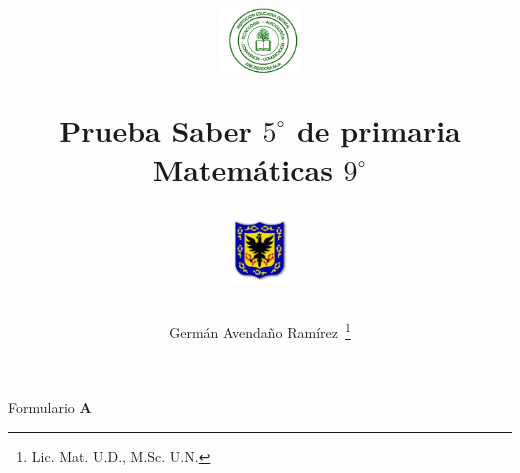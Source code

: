\documentclass[10pt,addpoints]{exam}
\begin{document}
\title{\begin{minipage}{.2\textwidth}
        \includegraphics[height=1.75cm]{Images/logo-colegio.png}
       \end{minipage}
\begin{minipage}{.55\textwidth}
 \begin{center}
Prueba Saber $5^{\circ}$ de primaria\\Matemáticas $9^{\circ}$
\end{center}
\end{minipage}
\begin{minipage}{.2\textwidth}
\includegraphics[height=1.75cm]{Images/logo-sed.png} 
\end{minipage}
}
\author{Germ\'{a}n Avendaño Ram\'{i}rez~\thanks{Lic. Mat. U.D., M.Sc. U.N.}}
\date{}
\maketitle
\begin{center}
\end{center}
Formulario \textbf{A}
\end{document}
